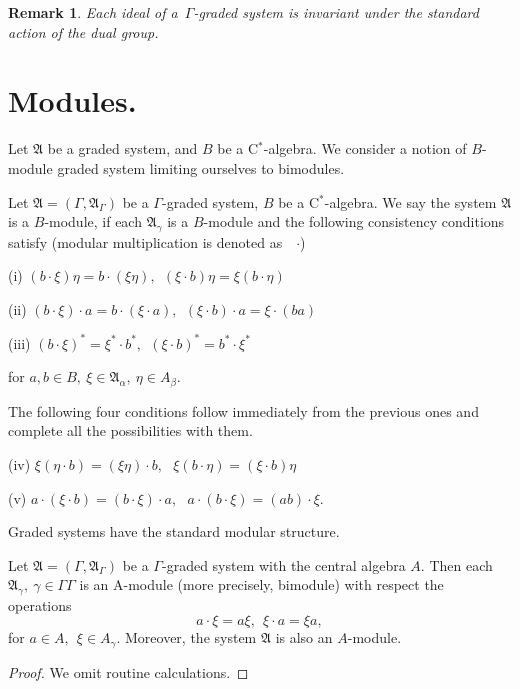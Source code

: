 \documentclass[
11pt,%
tightenlines,%
twoside,%
onecolumn,%
nofloats,%
nobibnotes,%
nofootinbib,%
superscriptaddress,%
noshowpacs,%
centertags]%
{revtex4}
\newtheorem{remark}{Remark} %
\begin{document}
\begin{remark} Each ideal of a\ $\Gamma$-graded system is invariant under the standard action of the dual group.
\end{remark}

\section{Modules.}
Let  $\mathfrak A$  be a graded system, and $B$ be a  C$^*$-algebra. We consider  a notion of $B$-module graded system limiting ourselves to bimodules.

\begin{definition}
Let  $\mathfrak A = (\Gamma, \mathfrak A_\Gamma)$ be a $\Gamma$-graded system, $B$  be a C$^*$-algebra. We say the system $\mathfrak A$ is a $B$-module, if each $\mathfrak A_\gamma$  is a  $B$-module and the following consistency conditions satisfy  (modular multiplication is denoted as\ \ $\cdot$)

\medskip (i) $(b\cdot\xi)\eta=b\cdot(\xi\eta), \ \ (\xi\cdot b)\eta=\xi(b\cdot\eta)$

\medskip (ii)
$(b\cdot\xi)\cdot a=b\cdot(\xi\cdot a), \ \ (\xi\cdot b)\cdot a=\xi\cdot (ba)$



 \medskip (iii)  $(b\cdot\xi)^*=\xi^*\cdot b^*, \ \ (\xi\cdot b)^*=b^*\cdot \xi^*$

\medskip
\noindent  for $a,b\in B, \  \xi\in\mathfrak  A_\alpha, \  \eta\in A_\beta$.

\end{definition}

\noindent The following four conditions follow immediately from the previous ones and complete all the possibilities with them.

\medskip (iv) $\xi(\eta\cdot b)=(\xi\eta)\cdot b, \ \ \ \xi(b\cdot\eta)=(\xi \cdot b)\eta$

\medskip (v)
$a\cdot(\xi\cdot b)=(b\cdot\xi)\cdot a, \ \ \  a\cdot (b\cdot\xi)=(ab)\cdot\xi$.

\medskip
\medskip
\noindent Graded systems have the standard modular structure.

\begin{proposition}\label{module}  Let  $\mathfrak A = (\Gamma, \mathfrak A_\Gamma)$ be a $\Gamma$-graded system  with the central algebra $A$. Then each $\mathfrak A_\gamma, \ \gamma\in\Gamma Γ$  is  an A-module (more precisely, bimodule) with respect the operations
    $$a\cdot\xi=a\xi, \ \ \xi\cdot a=\xi a,
    $$
for $a\in A,\ \ \xi\in A_\gamma$. Moreover, the system  $\mathfrak A$ is also an $A$-module.
\end{proposition}
\begin{proof}
We omit routine calculations.
\end{proof}
\end{document}
